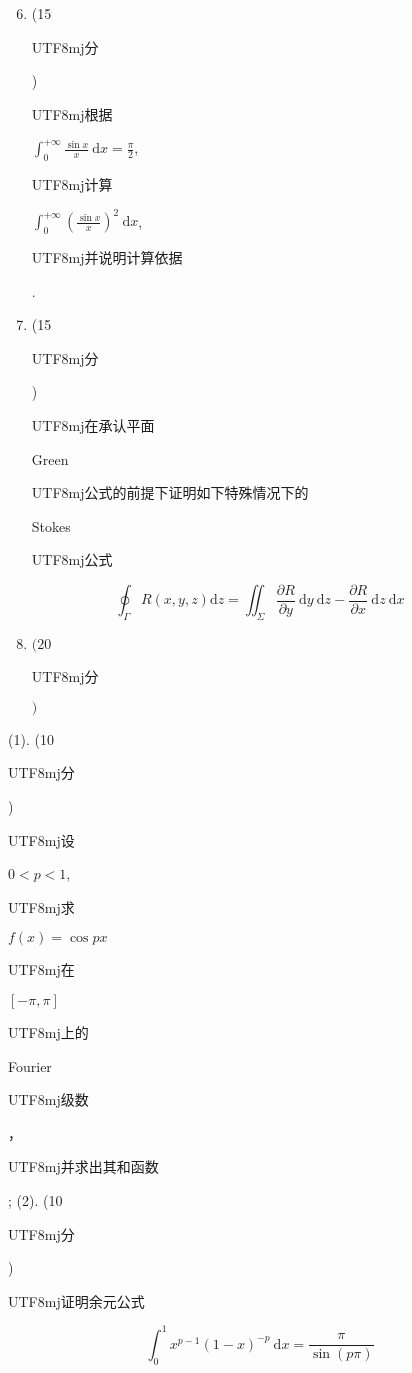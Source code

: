 \documentclass[10pt]{article}
\begin{document}
\begin{enumerate}
  \setcounter{enumi}{5}
  \item (15 \begin{CJK}{UTF8}{mj}分\end{CJK}) \begin{CJK}{UTF8}{mj}根据\end{CJK} $\int_{0}^{+\infty} \frac{\sin x}{x} \mathrm{~d} x=\frac{\pi}{2}$, \begin{CJK}{UTF8}{mj}计算\end{CJK} $\int_{0}^{+\infty}\left(\frac{\sin x}{x}\right)^{2} \mathrm{~d} x$, \begin{CJK}{UTF8}{mj}并说明计算依据\end{CJK}.

  \item (15 \begin{CJK}{UTF8}{mj}分\end{CJK}) \begin{CJK}{UTF8}{mj}在承认平面\end{CJK} Green \begin{CJK}{UTF8}{mj}公式的前提下证明如下特殊情况下的\end{CJK} Stokes \begin{CJK}{UTF8}{mj}公式\end{CJK}

\end{enumerate}
$$
\oint_{\Gamma} R(x, y, z) \mathrm{d} z=\iint_{\Sigma} \frac{\partial R}{\partial y} \mathrm{~d} y \mathrm{~d} z-\frac{\partial R}{\partial x} \mathrm{~d} z \mathrm{~d} x
$$

\begin{enumerate}
  \setcounter{enumi}{7}
  \item $(20$ \begin{CJK}{UTF8}{mj}分\end{CJK} $)$
\end{enumerate}
(1). (10 \begin{CJK}{UTF8}{mj}分\end{CJK}) \begin{CJK}{UTF8}{mj}设\end{CJK} $0<p<1$, \begin{CJK}{UTF8}{mj}求\end{CJK} $f(x)=\cos p x$ \begin{CJK}{UTF8}{mj}在\end{CJK} $[-\pi, \pi]$ \begin{CJK}{UTF8}{mj}上的\end{CJK} Fourier \begin{CJK}{UTF8}{mj}级数\end{CJK}，\begin{CJK}{UTF8}{mj}并求出其和函数\end{CJK}; (2). (10 \begin{CJK}{UTF8}{mj}分\end{CJK}) \begin{CJK}{UTF8}{mj}证明余元公式\end{CJK}
$$
\int_{0}^{1} x^{p-1}(1-x)^{-p} \mathrm{~d} x=\frac{\pi}{\sin (p \pi)}
$$
\end{document}
